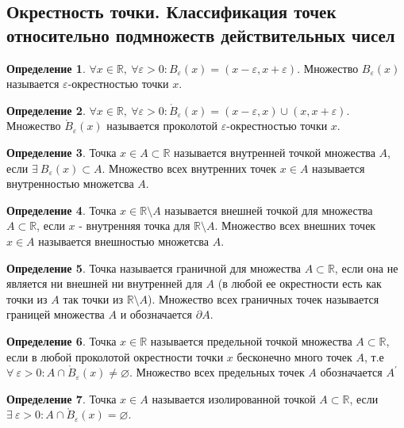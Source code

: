 \documentclass[a4paper, 12pt]{article}
\newcommand{\R}{\mathbb{R}}
\renewcommand{\epsilon}{\varepsilon}
\renewcommand{\emptyset}{\varnothing}
\theoremstyle{definition}
\newtheorem*{definition}{Определение}
\begin{document}
    \subsection{Окрестность точки. Классификация точек относительно подмножеств действительных чисел}
        \begin{definition}
            $\forall x\in \R,\ \forall \epsilon>0: B_{\epsilon}(x)=(x-\epsilon, x+\epsilon)$. Множество $B_{\epsilon}(x)$ называется $\epsilon$-окрестностью точки $x$.
        \end{definition}
        \begin{definition}
            $\forall x\in \R,\ \forall \epsilon>0: \mathring{B}_{\epsilon}(x)=(x-\epsilon,x)\cup(x,x+\epsilon)$.  Множество $\mathring{B}_{\epsilon}(x)$ называется проколотой $\epsilon$-окрестностью точки $x$.
        \end{definition} 
        \begin{definition}
            Точка $x\in A\subset \R$ называется внутренней точкой множества $A$, если $\exists \ B_{\epsilon}(x)\subset A$. Множество всех внутренних точек $x\in A$ называется внутренностью множетсва $A$.
        \end{definition} 
        \begin{definition}
            Точка $x\in \R\setminus A$ называется внешней точкой для множества $A\subset \R$, если $x$ - внутренняя точка для $\R\setminus A$. Множество всех внешних точек $x\in A$ называется внешностью множетсва $A$.
        \end{definition}
        \begin{definition}
            Точка называется граничной для множества $A\subset \R$, если она не является ни внешней ни внутренней для $A$ (в любой ее окрестности есть как точки из $A$ так точки из $\R \setminus A$). Множество всех граничных точек называется границей множества $A$ и обозначается $\partial A$.
        \end{definition}
        \begin{definition}
            Точка $x\in \R$ называется предельной точкой множества $A\subset \R$, если в любой проколотой окрестности точки $x$ бесконечно много точек $A$, т.е\\
            $\forall\ \epsilon >0: A\cap \mathring{B}_{\epsilon}(x)\ne\emptyset$. Множество всех предельных точек $A$ обозначается $A^{\prime}$
        \end{definition} 
        \begin{definition}
            Точка $x\in A$ называется изолированной точкой $A\subset \R$, если $\exists \ \epsilon>0: A\cap \mathring{B}_{\epsilon}(x)=\emptyset$.
        \end{definition} 
\end{document}
